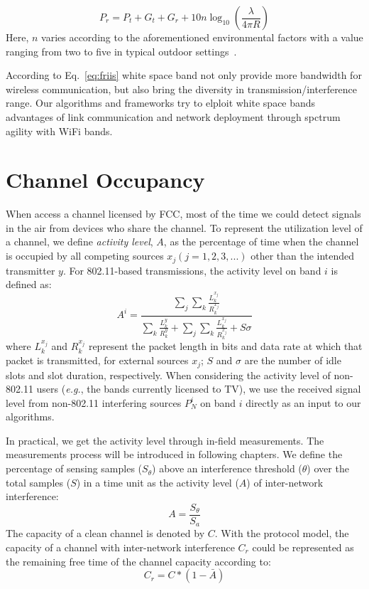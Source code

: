 \begin{equation}
\label{eq:friis}
P_r=P_t+G_t+G_r+10n \log_{10}\left( \frac{\lambda}{4\pi R}\right)
\end{equation}
Here, $n$ varies according to the aforementioned environmental 
factors with a value ranging from two to five in typical outdoor 
settings~\cite{rappaport}.

According to Eq.~\ref{eq:friis} white space band not only provide more 
bandwidth for wireless communication, but also bring the diversity in 
transmission/interference range. Our algorithms and frameworks try to 
elploit white space bands advantages of link communication and network 
deployment through spctrum agility with WiFi bands.


\section{Channel Occupancy}

When access a channel licensed by FCC, most of the time we could detect signals in the 
air from devices who share the channel. To represent the utilization level of a channel, 
we define \emph{activity level}, $A$, as the percentage of time when the channel is 
occupied by all competing sources $x_j (j = 1, 2, 3, ...)$ other than the intended 
transmitter $y$. For 802.11-based transmissions, the activity level on band $i$ is 
defined as:
\begin{equation}
\label{eqn:80211activity}
A^i = \frac{\sum_j{\sum_k{\frac{L_k^{x_j}}{R_k^{x_j}}}}}{\sum_k{\frac{L_k^y}{R_k^y}}+\sum_j{\sum_k{\frac{L_k^{x_j}}{R_k^{x_j}}}}+S\sigma}
\end{equation}
where $L_k^{x_j}$ and $R_k^{x_j}$ represent the packet length in bits and data
rate at which that packet is transmitted, for external sources $x_j$;
$S$ and $\sigma$ are the number of idle slots and slot duration, respectively. 
When considering the activity level of non-802.11 users 
({\it e.g.}, the bands currently licensed to TV),
we use the received signal level from non-802.11 interfering sources $P_N^i$ 
on band $i$ directly as an input to our algorithms. 


In practical, we get the activity level through in-field measurements.
The measurements process will be introduced in following chapters.
We define the percentage of sensing samples ($S_\theta$) above an 
interference threshold ($\theta$) over the total samples ($S$) in a time unit as the 
activity level ($A$) of inter-network interference:
\begin{equation}
\label{eq:actdef}
A=\frac{S_\theta}{S_a}
\end{equation}
The capacity of a clean channel is denoted by $C$. With the protocol model, the capacity 
of a channel with inter-network interference $C_r$ could be represented as 
the remaining free time of the channel capacity according to: 
\begin{equation}
\label{eq:intercap}
C_r=C*(1-\bar{A})
\end{equation}


